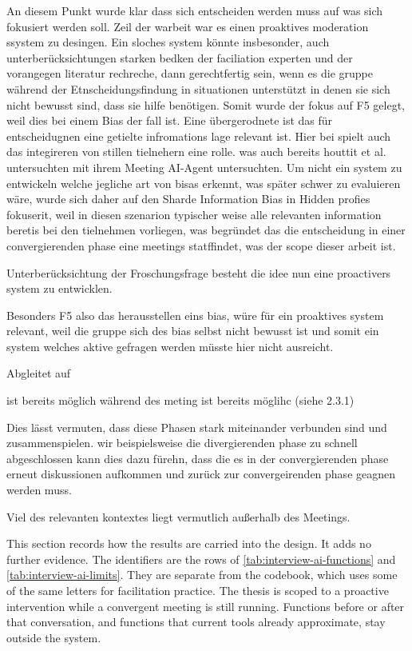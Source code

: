 An diesem Punkt wurde klar dass sich entscheiden werden muss auf was sich fokusiert werden soll. Zeil der
warbeit war es einen proaktives moderation ssystem zu desingen. Ein sloches system könnte insbesonder, auch
unterberücksichtungen starken bedken der faciliation experten und der vorangegen literatur rechreche, dann
gerechtfertig sein, wenn es die gruppe während der Etnscheidungsfindung in situationen unterstützt in denen
sie sich nicht bewusst sind, dass sie hilfe benötigen. Somit wurde der fokus auf F5 gelegt, weil dies bei
einem Bias der fall ist.
Eine übergerodnete ist das für entscheidugnen eine getielte infromations lage relevant ist. Hier bei spielt
auch das integireren von stillen tielnehern eine rolle. was auch bereits houttit et al. untersuchten
\cite{houttiObserveAskIntervene2025} mit ihrem Meeting AI-Agent untersuchten. Um nicht ein system zu
entwickeln welche jegliche art von bisas erkennt, was später schwer zu evaluieren wäre, wurde sich daher auf
den Sharde Information Bias in Hidden profies fokuserit, weil in diesen szenarion typischer weise alle
relevanten information beretis bei den tielnehmen vorliegen, was begründet das die entscheidung in einer
convergierenden phase eine meetings statffindet, was der scope dieser arbeit ist.

Unterberücksichtung der
Froschungsfrage besteht die idee nun eine proactivers system zu entwicklen.

Besonders F5 also das herausstellen eins bias, würe für
ein proaktives system relevant, weil die gruppe sich des bias selbst nicht bewusst ist und somit ein system
welches aktive gefragen werden müsste hier nicht ausreicht.

Abgleitet auf

ist bereits möglich während des meting ist bereits
möglihc  (siehe 2.3.1)

Dies lässt vermuten, dass diese Phasen stark miteinander verbunden sind und zusammenspielen. wir
beispielsweise die divergierenden phase zu schnell abgeschlossen kann dies dazu fürehn, dass die es in der
convergierenden phase erneut diskussionen aufkommen und zurück zur convergeirenden phase geagnen werden muss.

Viel des relevanten kontextes liegt vermutlich außerhalb des Meetings.


This section records how the results are carried into the design.
It adds no further evidence.
The identifiers are the rows of \autoref{tab:interview-ai-functions} and
\autoref{tab:interview-ai-limits}.
They are separate from the codebook, which uses some of the same letters for facilitation
practice.
The thesis is scoped to a proactive intervention while a convergent meeting is still running.
Functions before or after that conversation, and functions that current tools already
approximate, stay outside the system.

